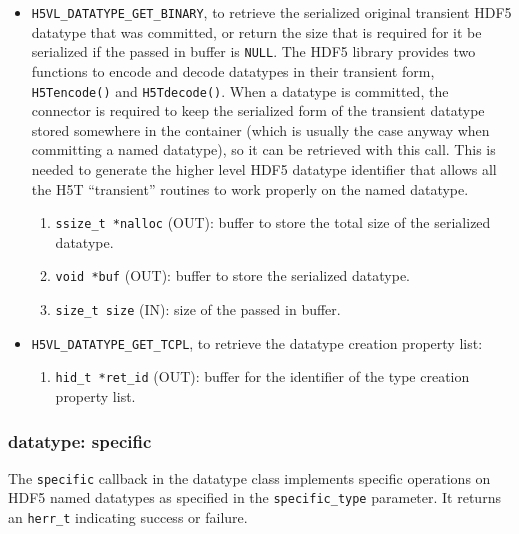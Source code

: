 \begin{itemize}
\item \texttt{H5VL\_DATATYPE\_GET\_BINARY}, to retrieve the serialized original transient HDF5 datatype that was committed, or
return the size that is required for it be serialized if the passed in buffer is \texttt{NULL}. The HDF5 library provides two functions to
encode and decode datatypes in their transient form, \texttt{H5Tencode()} and \texttt{H5Tdecode()}. When a datatype is committed, the connector is required to keep the serialized form of the transient datatype stored somewhere in the container (which is usually the case anyway when committing a named datatype), so it can be retrieved with this call. This is needed to generate the higher level HDF5 datatype identifier that allows all the H5T ``transient'' routines to work properly on the named datatype.
  \begin{enumerate}
  \item \texttt{ssize\_t *nalloc} (OUT): buffer to store the total size of the serialized datatype.
  \item \texttt{void *buf} (OUT): buffer to store the serialized datatype.
  \item \texttt{size\_t size} (IN): size of the passed in buffer.
  \end{enumerate}
  
\item \texttt{H5VL\_DATATYPE\_GET\_TCPL}, to retrieve the datatype
  creation property list:
  \begin{enumerate}
  \item \texttt{hid\_t *ret\_id} (OUT): buffer for the identifier of the
    type creation property list.
  \end{enumerate}
\end{itemize}

\subsubsection{datatype: specific}
The \texttt{specific} callback in the datatype class implements specific operations on HDF5 named datatypes as specified in the \texttt{specific\_type} parameter. It returns an \texttt{herr\_t} indicating success or failure.\bigskip

